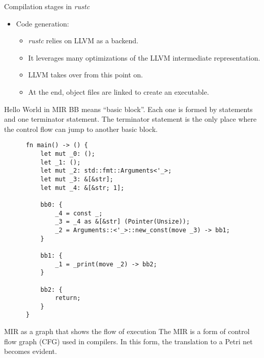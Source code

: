 \documentclass{beamer}
\begin{document}
\begin{frame}{Compilation stages in \emph{rustc}}
\begin{itemize}
\begin{itemize}
          \end{itemize}
          \pause
    \item Code generation:
          \begin{itemize}
            \scriptsize
            [circle]
            \item \emph{rustc} relies on LLVM as a backend.
            \item It leverages many optimizations of the LLVM intermediate representation.
            \item LLVM takes over from this point on.
            \item At the end, object files are linked to create an executable.
          \end{itemize}
  \end{itemize}
\end{frame}

\begin{frame}[fragile]{Hello World in MIR}
  \tiny
  BB means ``basic block''. Each one is formed by statements and one terminator statement.
  The terminator statement is the only place where the control flow can jump to another basic block.

  \begin{listing}
    \begin{verbatim}
      fn main() -> () {
          let mut _0: ();                     
          let _1: ();                         
          let mut _2: std::fmt::Arguments<'_>;
          let mut _3: &[&str];                
          let mut _4: &[&str; 1];             
      
          bb0: {
              _4 = const _;                    
              _3 = _4 as &[&str] (Pointer(Unsize));
              _2 = Arguments::<'_>::new_const(move _3) -> bb1;
          }
      
          bb1: {
              _1 = _print(move _2) -> bb2;
          }
      
          bb2: {
              return;
          }
      }      
    \end{verbatim}
  \end{listing}
\end{frame}

\begin{frame}{MIR as a graph that shows the flow of execution}
  \scriptsize
  The MIR is a form of control flow graph (CFG) used in compilers.
  In this form, the translation to a Petri net becomes evident.

  \begin{figure}[!htb]
    \centering
    
  \end{figure}
\end{frame}
\end{document}
